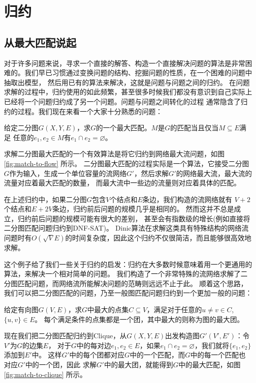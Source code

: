 \chapter{归约}


\section{从最大匹配说起}

对于许多问题来说，寻求一个直接的解答、构造一个直接解决问题的算法是非常困难的。我们早已习惯通过变换问题的结构、挖掘问题的性质，在一个困难的问题中抽取出模型，
然后用已有的算法来解决，这就是问题与问题之间的归约。
在问题求解的过程中，归约使用的如此频繁，甚至很多时候我们都没有意识到自己实际上已经将一个问题归约成了另一个问题。问题与问题之间转化的过程
通常隐含了归约的过程。我们现在来看一个大家十分熟悉的问题：

\begin{prob}
 给定二分图$G(X,Y,E)$，求$G$的一个最大匹配。$M$是$G$的匹配当且仅当$M\subseteq E$满足
 任意的$e_1, e_2 \in M$有$e_1\cap e_2 = \varnothing$。
\end{prob}
\begin{solution}
求解二分图最大匹配的一个有效算法是将它归约到网络最大流问题，如图 \ref{fig:match-to-flow} 所示。
二分图最大匹配的过程实际是一个算法，它接受二分图$G$作为输入，生成一个单位容量的流网络$G'$，然后求解$G'$的网络最大流，最大流的流量对应着最大匹配的数量，
而最大流中一些边的流量则对应着具体的匹配。



在上述归约中，如果二分图$G$包含$V$个结点和$E$条边，我们构造的流网络就有
$V+2$个结点和$E+2V$条边，归约前后问题的规模几乎是相同的。
然而这并不总是成立，归约前后问题的规模可能有很大的差别，
甚至会有指数级的增长(例如直接将二分图匹配问题归约到DNF-SAT)。 %
Dinic算法在求解这类具有特殊结构的网络流问题时有$O(\sqrt{V} E)$的时间复杂度，因此这个归约不仅很简洁，而且能够很高效地求解。
\end{solution}

这个例子给了我们一些关于归约的启发：归约在大多数时候意味着用一个更通用的算法，来解决一个相对简单的问题。
我们构造了一个非常特殊的流网络求解了二分图匹配问题，而网络流所能解决问题的范畴则远远不止于此。
顺着这个思路，我们可以把二分图匹配的问题，乃至一般图匹配问题归约到一个更加一般的问题：

\begin{prob}
给定有向图$G(V,E)$，求$G$中最大的点集$C\subseteq V$，满足对于任意的$u\neq v \in C$, $\{u, v\} \in E$。
每个满足条件的点集都是一个团，其中最大的则称为图的最大团。
\end{prob}
\begin{solution}
现在我们把二分图匹配归约到Clique，从$G(X, Y, E)$出发构造图$G'(V',E')$：令$V'$为$G$的边集$E$，
对于$G$中的每对边$e_1, e_2 \in E$，如果$e_1 \cap e_2 = \varnothing$，我们就将$\{e_1, e_2\}$添加到$E'$中。
这样$G'$中的每个团都对应$G$中的一个匹配，而$G$中的每一个匹配也对应$G'$中的一个团，因此
求解$G'$中的最大团，就能得到$G$中的最大匹配，如图 \ref{fig:match-to-clique} 所示。
\end{solution}

